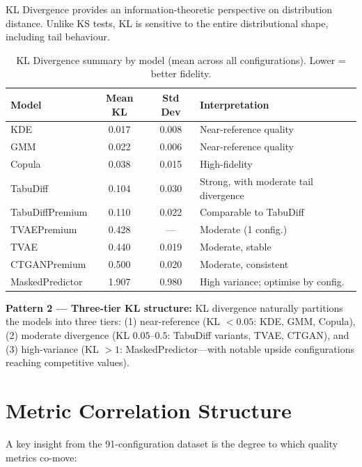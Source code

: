 \documentclass[11pt, a4paper]{report}
\begin{document}
KL Divergence provides an information-theoretic perspective on distribution distance. Unlike KS tests, KL is sensitive to the entire distributional shape, including tail behaviour.

\begin{table}[H]
\centering
\caption{KL Divergence summary by model (mean across all configurations). Lower = better fidelity.}
\label{tab:kl}
\begin{tabular}{lccl}
\toprule
\textbf{Model} & \textbf{Mean KL} & \textbf{Std Dev} & \textbf{Interpretation} \\
\midrule
KDE             & 0.017 & 0.008 & Near-reference quality \\
GMM             & 0.022 & 0.006 & Near-reference quality \\
Copula          & 0.038 & 0.015 & High-fidelity \\
TabuDiff        & 0.104 & 0.030 & Strong, with moderate tail divergence \\
TabuDiffPremium & 0.110 & 0.022 & Comparable to TabuDiff \\
TVAEPremium     & 0.428 & ---   & Moderate (1 config.) \\
TVAE            & 0.440 & 0.019 & Moderate, stable \\
CTGANPremium    & 0.500 & 0.020 & Moderate, consistent \\
MaskedPredictor & 1.907 & 0.980 & High variance; optimise by config. \\
\bottomrule
\end{tabular}
\end{table}

\begin{patternbox}
\textbf{Pattern 2 --- Three-tier KL structure:} KL divergence naturally partitions the models into three tiers: (1) near-reference (KL $< 0.05$: KDE, GMM, Copula), (2) moderate divergence (KL $0.05$--$0.5$: TabuDiff variants, TVAE, CTGAN), and (3) high-variance (KL $> 1$: MaskedPredictor---with notable upside configurations reaching competitive values).
\end{patternbox}

\section{Metric Correlation Structure}

A key insight from the 91-configuration dataset is the degree to which quality metrics co-move:
\end{document}
